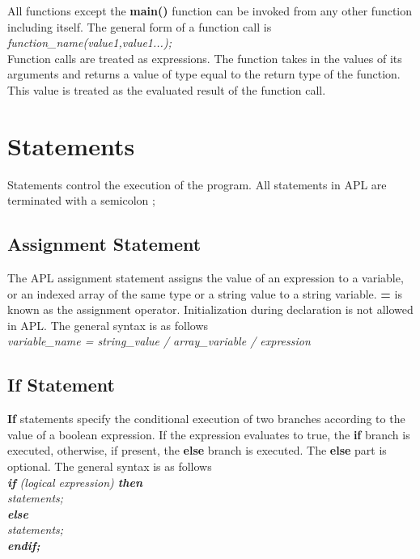 \documentclass[11pt]{article}
\begin{document}
All functions except the \textbf{main()} function can be invoked from any other function including itself. The general form of a function call is \\

\textit{function\_name(value1,value1...);}
\\

Function calls are treated as expressions. The function takes in the values of its arguments and returns a value of type equal to the return type of the function. This value is treated as the evaluated result of the function call.




\section{Statements}

Statements control the execution of the program. All statements in APL are terminated with a semicolon ;





\subsection{Assignment Statement}
The APL assignment statement assigns the value of an expression to a variable, or an indexed array of the same type or a string value to a string variable. \textbf{=} is known as the assignment operator. Initialization during declaration is not allowed in APL. The general syntax is as follows \\
\textit{ variable\_name = string\_value / array\_variable / expression }






\subsection{If Statement}
\textbf{If} statements specify the conditional execution of two branches according to the value of a boolean expression. If the expression evaluates to true, the \textbf{if} branch is executed, otherwise, if present, the \textbf{else}  branch is executed. The \textbf{else} part is optional. The general syntax is as follows  \\

\textit{
\textbf{if} (logical expression) \textbf{then}  \\
 \indent \indent statements; \\
\indent \textbf{else} \\
\indent  \indent statements; \\
\indent \textbf{endif;}  \\
}
\end{document}
